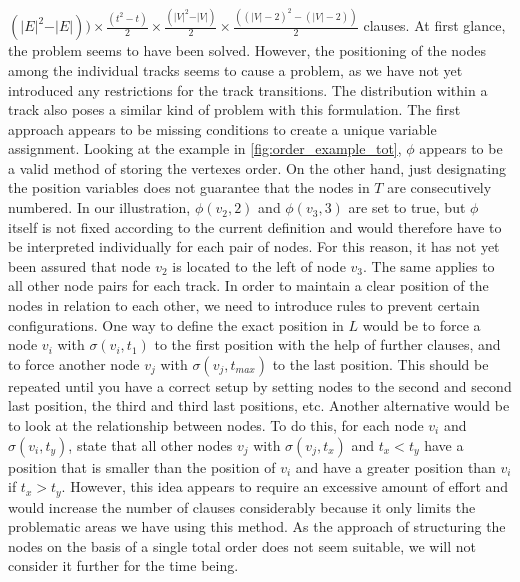 \documentclass[bachelor, english]{algothesis}
\begin{document}
$ (\vert E \vert^2 - \vert E \vert)) \times \frac{(t^2-t)}{2} \times \frac{(\vert V \vert^2-\vert V \vert)}{2} \times \frac{((\vert V \vert-2)^2-(\vert V \vert-2))}{2}$ clauses.
\noindent \newline
At first glance, the problem seems to have been solved. However, the positioning of the nodes among the individual tracks seems to cause a problem, as we have not yet introduced any restrictions for the track transitions. The distribution within a track also poses a similar kind of problem with this formulation. The first approach appears to be missing conditions to create a unique variable assignment. Looking at the example in \cref{fig:order_example_tot}, $\phi$ appears to be a valid method of storing the vertexes order. On the other hand, just designating the position variables does not guarantee that the nodes in $T$ are consecutively numbered. In our illustration, $\phi(v_2,2)$ and $\phi(v_3,3)$ are set to true, but $\phi$ itself is not fixed according to the current definition and would therefore have to be interpreted individually for each pair of nodes. For this reason, it has not yet been assured that node $v_2$ is located to the left of node $v_3$.
The same applies to all other node pairs for each track. In order to maintain a clear position of the nodes in relation to each other, we need to introduce rules to prevent certain configurations. \newline
One way to define the exact position in $L$ would be to force a node $v_i$ with $\sigma(v_i,t_1)$ to the first position with the help of further clauses, and to force another node $v_j$ with $\sigma(v_j,t_{max})$ to the last position. This should be repeated until you have a correct setup by setting nodes to the second and second last position, the third and third last positions, etc. Another alternative would be to look at the relationship between nodes. To do this, for each node $v_i$ and $\sigma(v_i, t_y)$, state that all other nodes $v_j$ with $\sigma(v_j, t_x)$ and $t_x < t_y$ have a position that is smaller than the position of $v_i$ and have a greater position than $v_i$ if $t_x > t_y$. However, this idea appears to require an excessive amount of effort and would increase the number of clauses considerably because it only limits the problematic areas we have using this method. As the approach of structuring the nodes on the basis of a single total order does not seem suitable, we will not consider it further for the time being.
\end{document}
